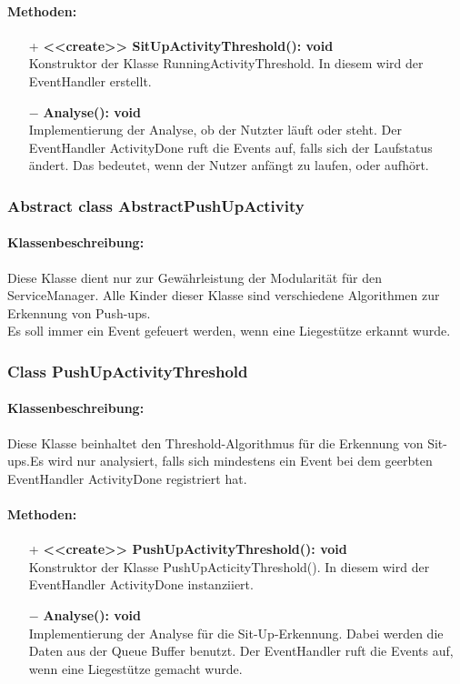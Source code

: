 \documentclass[a4paper,12pt]{article}
\begin{document}
	\paragraph{Methoden:}
	\begin{itemize}
		\item [+]\textbf{<<create>> SitUpActivityThreshold(): void}\\Konstruktor der Klasse RunningActivityThreshold. In diesem wird der EventHandler erstellt.
		\item [$-$]\textbf{Analyse(): void}\\Implementierung der Analyse, ob der Nutzter läuft oder steht. Der EventHandler ActivityDone ruft die Events auf, falls sich der Laufstatus ändert. Das bedeutet, wenn der Nutzer anfängt zu laufen, oder aufhört. 
	\end{itemize}
	
	
	\subsubsection{Abstract class AbstractPushUpActivity}
	\paragraph{Klassenbeschreibung:}
	Diese Klasse dient nur zur Gewährleistung der Modularität für den ServiceManager. Alle Kinder dieser Klasse sind verschiedene Algorithmen zur Erkennung von Push-ups.\\ Es soll immer ein Event gefeuert werden, wenn eine Liegestütze erkannt wurde.
	
	\subsubsection{Class PushUpActivityThreshold}
	\paragraph{Klassenbeschreibung:}
	Diese Klasse beinhaltet den Threshold-Algorithmus für die Erkennung von Sit-ups.Es wird nur analysiert, falls sich mindestens ein Event bei dem geerbten EventHandler ActivityDone registriert hat.
	\paragraph{Methoden:}
	\begin{itemize}
		\item [+]\textbf{<<create>> PushUpActivityThreshold(): void}\\Konstruktor der Klasse PushUpActicityThreshold(). In diesem wird der EventHandler ActivityDone instanziiert. 
		\item [$-$]\textbf{Analyse(): void}\\Implementierung der Analyse für die Sit-Up-Erkennung. Dabei werden die Daten aus der Queue Buffer benutzt. Der EventHandler ruft die Events auf, wenn eine Liegestütze gemacht wurde.
	\end{itemize}
\end{document}
